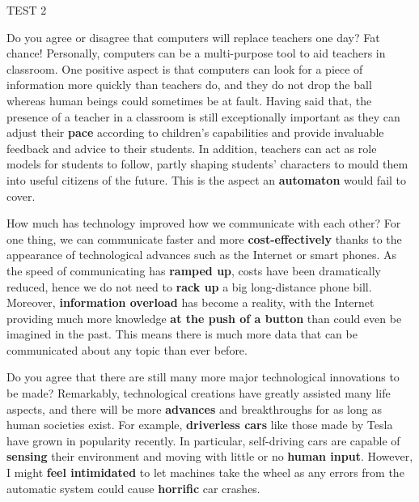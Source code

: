 \begin{glossarymc}[Cambridge 13]
\begin{test}{TEST 2}
    \begin{qa}{Do you agree or disagree that computers will replace teachers one day?}
    Fat chance! Personally, computers can be a multi-purpose tool to aid teachers in classroom. One positive aspect is that computers can look for a piece of information more quickly than teachers do, and they do not drop the ball whereas human beings could sometimes be at fault. Having said that, the presence of a teacher in a classroom is still exceptionally important as they can adjust their \textbf{pace} according to children’s capabilities and provide invaluable feedback and advice to their students. In addition, teachers can act as role models for students to follow, partly shaping students’ characters to mould them into useful citizens of the future. This is the aspect an \textbf{automaton} would fail to cover.
    \end{qa}

    \begin{qa}{How much has technology improved how we communicate with each other?}
    For one thing, we can communicate faster and more \textbf{cost-effectively} thanks to the appearance of technological advances such as the Internet or smart phones. As the speed of communicating has \textbf{ramped up}, costs have been dramatically reduced, hence we do not need to \textbf{rack up} a big long-distance phone bill. Moreover, \textbf{information overload} has become a reality, with the Internet providing much more knowledge \textbf{at the push of a button} than could even be imagined in the past. This means there is much more data that can be communicated about any topic than ever before.
    \end{qa}

    \begin{qa}{Do you agree that there are still many more major technological innovations to be made?}
    Remarkably, technological creations have greatly assisted many life aspects, and there will be more \textbf{advances} and breakthroughs for as long as human societies exist. For example, \textbf{driverless cars} like those made by Tesla have grown in popularity recently. In particular, self-driving cars are capable of \textbf{sensing} their environment and moving with little or no \textbf{human input}. However, I might \textbf{feel intimidated} to let machines take the wheel as any errors from the automatic system could cause \textbf{horrific} car crashes.
    \end{qa}


\end{test}
\end{glossarymc}

